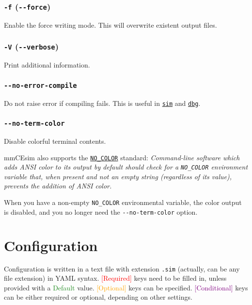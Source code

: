 \subsubsection{\texttt{-f} (\texttt{-{}-force})}
Enable the force writing mode.
This will overwrite existent output files.

\subsubsection{\texttt{-V} (\texttt{-{}-verbose})}
Print additional information.

\subsubsection{\texttt{-{}-no-error-compile}}
Do not raise error if compiling fails.
This is useful in \hyperref[d:subsec:sim]{\texttt{sim}} and \hyperref[d:subsec:dbg]{\texttt{dbg}}.

\subsubsection{\texttt{-{}-no-term-color}}
Disable colorful terminal contents.

\begin{tip}
  mmCEsim also supports the \href{https://no-color.org}{\texttt{NO\_COLOR}} standard:
  \textit{Command-line software which adds ANSI color to its output by default
    should check for a \texttt{NO\_COLOR} environment variable that,
    when present and not an empty string (regardless of its value),
    prevents the addition of ANSI color.}
\end{tip}

When you have a non-empty \texttt{NO\_COLOR} environmental variable,
the color output is disabled,
and you no longer need the \texttt{-{}-no-term-color} option.

\section{Configuration}

Configuration is written in a text file with extension \texttt{.sim} (actually, can be any file extension)
in YAML syntax.
\textcolor{Red}{\textsf{[Required]}} keys need to be filled in, unless provided with a
\textcolor{forestgreen}{\textsf{Default}} value.
\textcolor{Orange}{\textsf{[Optional]}} keys can be specified.
\textcolor{Purple}{\textsf{[Conditional]}} keys can be either required or optional,
depending on other settings.

